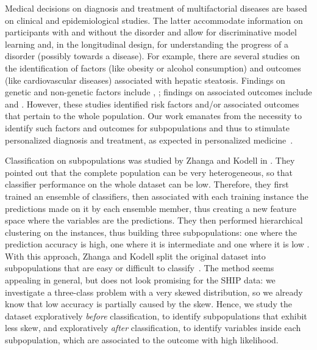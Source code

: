 \documentclass[
]{book}
\begin{document}
Medical decisions on diagnosis and treatment of multifactorial diseases are based on clinical and epidemiological studies.
The latter accommodate information on participants with and without the disorder and allow for discriminative model learning and, in the longitudinal design, for understanding the progress of a disorder (possibly towards a disease).
For example, there are several studies on the identification of factors (like obesity or alcohol consumption) and outcomes (like cardiovascular diseases) associated with hepatic steatosis.
Findings on genetic and non-genetic factors include \autocite{IttermannEtAl:Thyroid2012,LauEtAl:2010}, \autocite{StickelEtAl:2011}; findings on associated outcomes include \autocite{Targher:2010} and \autocite{Markus:2013}.
However, these studies identified risk factors and/or associated outcomes that pertain to the whole population.
Our work emanates from the necessity to identify such factors and outcomes for subpopulations and thus to stimulate personalized diagnosis and treatment, as expected in personalized medicine~\autocite{Hingorani:2013,Voelzke:Cardiol2013}.

Classification on subpopulations was studied by Zhanga and Kodell in \autocite{AIM13}.
They pointed out that the complete population can be very heterogeneous, so that classifier performance on the whole dataset can be low. Therefore, they first trained an ensemble of classifiers, then associated with each training instance the predictions made on it by each ensemble member, thus creating a new feature space where the variables are the predictions. They then performed hierarchical clustering on the instances, thus building three subpopulations: one where the prediction accuracy is high, one where it is intermediate and one where it is low \autocite{AIM13}.
With this approach, Zhanga and Kodell split the original dataset into subpopulations that are easy or difficult to classify~\autocite{AIM13}.
The method seems appealing in general, but does not look promising for the SHIP data: we investigate a three-class problem with a very skewed distribution, so we already know that low accuracy is partially caused by the skew.
Hence, we study the dataset exploratively \emph{before} classification, to identify subpopulations that exhibit less skew, and exploratively \emph{after} classification, to identify variables inside each subpopulation, which are associated to the outcome with high likelihood.
\end{document}
